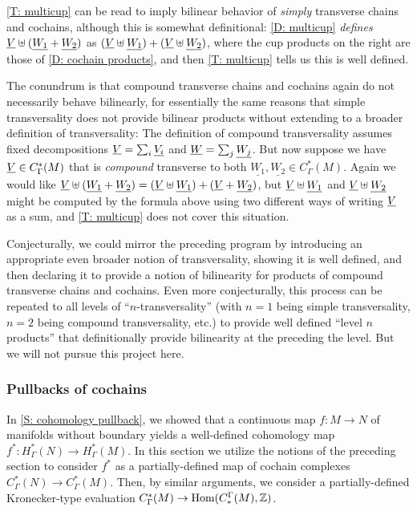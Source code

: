 \cref{T: multicup} can be read to imply bilinear behavior of \textit{simply} transverse chains and cochains, although this is somewhat definitional: \cref{D: multicup} \textit{defines} $\underline{V} \uplus (\underline{W_1} + \underline{W_2})$ as  $(\underline{V} \uplus \underline{W_1}) + (\underline{V} \uplus \underline{W_2})$, where the cup products on the right are those of \cref{D: cochain products}, and then \cref{T: multicup} tells us this is well defined.

The conundrum is that compound transverse chains and cochains again do not necessarily behave bilinearly, for essentially the same reasons that simple transversality does not provide bilinear products without extending to a broader definition of transversality:
The definition of compound transversality assumes fixed decompositions $\underline{V} = \sum_i \underline{V_i}$ and $\underline{W} = \sum_j \underline{W_j}$.
But now suppose we have $\underline{V} \in C_\Gamma^*(M)$ that is \textit{compound} transverse to both $\underline{W_1}, \underline{W_2} \in C_\Gamma^*(M)$.
Again we would like $\underline{V} \uplus (\underline{W_1} + \underline{W_2})  = (\underline{V} \uplus \underline{W_1}) + (\underline{V} + \underline{W_2})$, but $\underline{V} \uplus \underline{W_1}$ and $\underline{V} \uplus \underline{W_2}$ might be computed by the formula above using two different ways of writing $\underline{V}$ as a sum, and \cref{T: multicup} does not cover this situation.

Conjecturally, we could mirror the preceding program by introducing an appropriate even broader notion of transversality, showing it is well defined, and then declaring it to provide a notion of bilinearity for products of compound transverse chains and cochains.
Even more conjecturally, this process can be repeated to all levels of ``$n$-transversality'' (with $n=1$ being simple transversality, $n=2$ being compound transversality, etc.) to provide well defined ``level $n$ products'' that definitionally provide bilinearity at the preceding the level.
But we will not pursue this project here.



\subsubsection{Pullbacks of cochains}\label{S: product pullbacks}

In \cref{S: cohomology pullback}, we showed that a continuous map $f \colon M \to N$ of manifolds without boundary yields a well-defined cohomology map $f^* \colon H^*_\Gamma(N) \to H^*_\Gamma(M)$.
In this section we utilize the notions of the preceding section to consider $f^*$ as a partially-defined map of cochain complexes $C^*_\Gamma(N) \to C^*_\Gamma(M)$.
Then, by similar arguments, we consider a partially-defined Kronecker-type evaluation $C^*_\Gamma(M) \to \textup{Hom}(C_*^\Gamma(M),\mathbb{Z})$.


